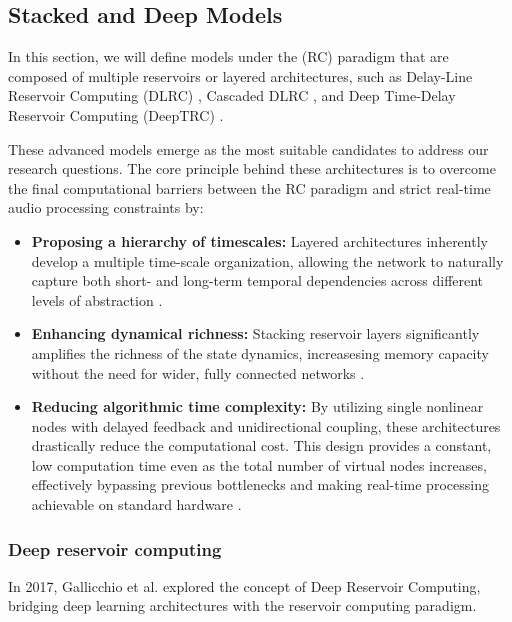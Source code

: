 \subsection{Stacked and Deep Models}

In this section, we will define models under the (RC) paradigm that are composed of multiple reservoirs or layered architectures, such as Delay-Line Reservoir Computing (DLRC) \cite{Appeltant2011Information}, Cascaded DLRC \cite{Keuninckx2017RealTime}, and Deep Time-Delay Reservoir Computing (DeepTRC) \cite{goldmann2020deep}. 

These advanced models emerge as the most suitable candidates to address our research questions. The core principle behind these architectures is to overcome the final computational barriers between the RC paradigm and strict real-time audio processing constraints by:

\begin{itemize}
    \item \textbf{Proposing a hierarchy of timescales:} Layered architectures inherently develop a multiple time-scale organization, allowing the network to naturally capture both short- and long-term temporal dependencies across different levels of abstraction \cite{Gallicchio2017}.
    \item \textbf{Enhancing dynamical richness:} Stacking reservoir layers significantly amplifies the richness of the state dynamics,  increasesing memory capacity without the need for wider, fully connected networks \cite{Gallicchio2017, goldmann2020deep}.
    \item \textbf{Reducing algorithmic time complexity:} By utilizing single nonlinear nodes with delayed feedback and unidirectional coupling, these architectures drastically reduce the computational cost. This design provides a constant, low computation time even as the total number of virtual nodes increases, effectively bypassing previous bottlenecks and making real-time processing achievable on standard hardware \cite{Appeltant2011Information, Keuninckx2017RealTime, goldmann2020deep}.
\end{itemize}


\subsubsection{Deep reservoir computing}

In 2017, Gallicchio et al. \cite{Gallicchio2017} explored the concept of Deep Reservoir Computing, bridging deep learning architectures with the reservoir computing paradigm.

